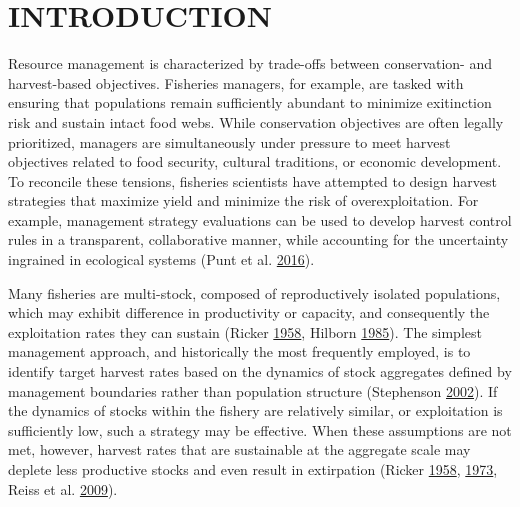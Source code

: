 \documentclass[11pt]{book}
\begin{document}
\frontmatter

\section{INTRODUCTION}\label{introduction}

Resource management is characterized by trade-offs between conservation- and harvest-based objectives. Fisheries managers, for example, are tasked with ensuring that populations remain sufficiently abundant to minimize exitinction risk and sustain intact food webs. While conservation objectives are often legally prioritized, managers are simultaneously under pressure to meet harvest objectives related to food security, cultural traditions, or economic development. To reconcile these tensions, fisheries scientists have attempted to design harvest strategies that maximize yield and minimize the risk of overexploitation. For example, management strategy evaluations can be used to develop harvest control rules in a transparent, collaborative manner, while accounting for the uncertainty ingrained in ecological systems (Punt et al. \protect\hyperlink{ref-Punt2016}{2016}).

Many fisheries are multi-stock, composed of reproductively isolated populations, which may exhibit difference in productivity or capacity, and consequently the exploitation rates they can sustain (Ricker \protect\hyperlink{ref-Ricker1958}{1958}, Hilborn \protect\hyperlink{ref-Hilborn1985}{1985}). The simplest management approach, and historically the most frequently employed, is to identify target harvest rates based on the dynamics of stock aggregates defined by management boundaries rather than population structure (Stephenson \protect\hyperlink{ref-Stephenson2002a}{2002}). If the dynamics of stocks within the fishery are relatively similar, or exploitation is sufficiently low, such a strategy may be effective. When these assumptions are not met, however, harvest rates that are sustainable at the aggregate scale may deplete less productive stocks and even result in extirpation (Ricker \protect\hyperlink{ref-Ricker1958}{1958}, \protect\hyperlink{ref-Ricker1973}{1973}, Reiss et al. \protect\hyperlink{ref-Reiss2009}{2009}).
\end{document}
